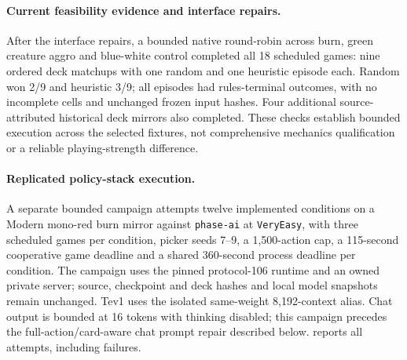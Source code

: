 \documentclass[11pt,a4paper]{article}
\theoremstyle{definition}
\theoremstyle{plain}
\begin{document}
\paragraph{Current feasibility evidence and interface repairs.}
After the interface repairs, a bounded native round-robin across burn,
green creature aggro and blue-white control completed all 18 scheduled games:
nine ordered deck matchups with one random and one heuristic episode each.
Random won 2/9 and heuristic 3/9; all episodes had rules-terminal outcomes,
with no incomplete cells and unchanged frozen input hashes. Four additional
source-attributed historical deck mirrors also completed. These checks
establish bounded execution across the selected fixtures, not comprehensive
mechanics qualification or a reliable playing-strength difference.

\paragraph{Replicated policy-stack execution.}
A separate bounded campaign attempts twelve implemented conditions on a
Modern mono-red burn mirror against \texttt{phase-ai} at \texttt{VeryEasy},
with three scheduled games per condition, picker seeds 7--9, a 1,500-action cap,
a 115-second cooperative game deadline and a shared 360-second process
deadline per condition.
The campaign uses the pinned protocol-106 runtime and an owned private
server; source, checkpoint and deck hashes and local model snapshots remain
unchanged. Tev1 uses the isolated same-weight 8,192-context alias. Chat output
is bounded at 16 tokens with thinking disabled; this campaign precedes the
full-action/card-aware chat prompt repair described below.
 reports all attempts, including failures.
\end{document}
